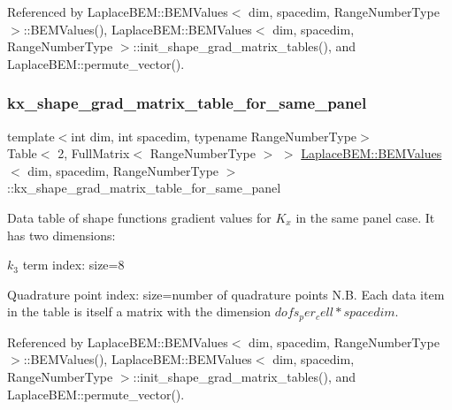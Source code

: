 Referenced by Laplace\+B\+E\+M\+::\+B\+E\+M\+Values$<$ dim, spacedim, Range\+Number\+Type $>$\+::\+B\+E\+M\+Values(), Laplace\+B\+E\+M\+::\+B\+E\+M\+Values$<$ dim, spacedim, Range\+Number\+Type $>$\+::init\+\_\+shape\+\_\+grad\+\_\+matrix\+\_\+tables(), and Laplace\+B\+E\+M\+::permute\+\_\+vector().

\mbox{\label{classLaplaceBEM_1_1BEMValues_a19d5b2247953a84c2974e2f2ff118810}} 
\subsubsection{\texorpdfstring{kx\+\_\+shape\+\_\+grad\+\_\+matrix\+\_\+table\+\_\+for\+\_\+same\+\_\+panel}{kx\_shape\_grad\_matrix\_table\_for\_same\_panel}}
{\footnotesize\ttfamily template$<$int dim, int spacedim, typename Range\+Number\+Type$>$ \\
Table$<$ 2, Full\+Matrix$<$ Range\+Number\+Type $>$ $>$ \hyperlink{classLaplaceBEM_1_1BEMValues}{Laplace\+B\+E\+M\+::\+B\+E\+M\+Values}$<$ dim, spacedim, Range\+Number\+Type $>$\+::kx\+\_\+shape\+\_\+grad\+\_\+matrix\+\_\+table\+\_\+for\+\_\+same\+\_\+panel}

Data table of shape function\textquotesingle{}s gradient values for $K_x$ in the same panel case. It has two dimensions\+:
\begin{DoxyEnumerate}
\item $k_3$ term index\+: size=8
\item Quadrature point index\+: size=number of quadrature points N.\+B. Each data item in the table is itself a matrix with the dimension $dofs_per_cell*spacedim$. 
\end{DoxyEnumerate}

Referenced by Laplace\+B\+E\+M\+::\+B\+E\+M\+Values$<$ dim, spacedim, Range\+Number\+Type $>$\+::\+B\+E\+M\+Values(), Laplace\+B\+E\+M\+::\+B\+E\+M\+Values$<$ dim, spacedim, Range\+Number\+Type $>$\+::init\+\_\+shape\+\_\+grad\+\_\+matrix\+\_\+tables(), and Laplace\+B\+E\+M\+::permute\+\_\+vector().

